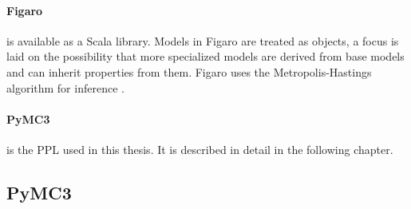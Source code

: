 \documentclass{article}
\begin{document}
\paragraph{Figaro}
is available as a Scala library. Models in Figaro are treated as objects, a focus is laid on the possibility that more specialized models are derived from base models and can inherit properties from them. Figaro uses the Metropolis-Hastings algorithm for inference \cite{pfeffer2009figaro}.
\paragraph{PyMC3}
is the PPL used in this thesis. It is described in detail in the following chapter.




\subsection{PyMC3}
\end{document}
